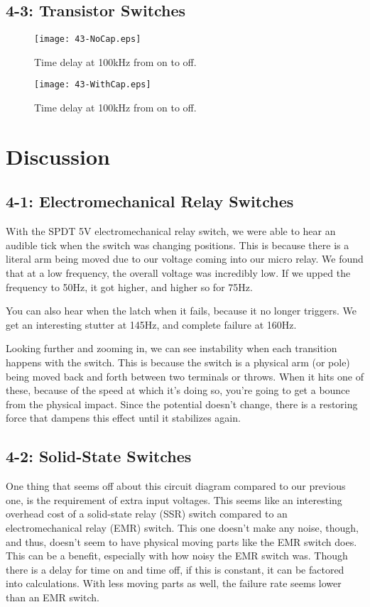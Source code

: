 \documentclass[%
 aip,
 jmp,
 amsmath,
 amssymb,
 reprint,%
 numerical,
 longbibliography,
]{revtex4-1}
\begin{document}
	\subsection{4-3: Transistor Switches}
	
	\begin{figure}[H]
	\texttt{[image: 43-NoCap.eps]}
	\caption{Time delay at 100kHz from on to off.}
	\end{figure}
	
	\begin{figure}[H]
	\texttt{[image: 43-WithCap.eps]}
	\caption{Time delay at 100kHz from on to off.}
	\end{figure}
	
\section{Discussion}
	
	\subsection{4-1: Electromechanical Relay Switches}
	
	With the SPDT 5V electromechanical relay switch, we were able to hear an audible tick when the switch
	was changing positions. This is because there is a literal arm being moved due to our voltage coming
	into our micro relay. We found that at a low frequency, the overall voltage was incredibly low. If
	we upped the frequency to 50Hz, it got higher, and higher so for 75Hz.
	
	You can also hear when the latch when it fails, because it no longer triggers. We get an interesting
	stutter at 145Hz, and complete failure at 160Hz.
	
	Looking further and zooming in, we can see instability when each transition happens with the switch.
	This is because the switch is a physical arm (or pole) being moved back and forth between two terminals
	or throws. When it hits one of these, because of the speed at which it's doing so, you're going to get a
	bounce from the physical impact. Since the potential doesn't change, there is a restoring force that
	dampens this effect until it stabilizes again. 

	\subsection{4-2: Solid-State Switches}
	
	One thing that seems off about this circuit diagram compared to our previous one, is the requirement of
	extra input voltages. This seems like an interesting overhead cost of a solid-state relay (SSR) switch compared
	to an electromechanical relay (EMR) switch. This one doesn't make any noise, though, and thus, doesn't seem to 
	have physical moving parts like the EMR switch does. This can be a benefit, especially with how noisy the
	EMR switch was. Though there is a delay for time on and time off, if this is constant, it can be factored
	into calculations. With less moving parts as well, the failure rate seems lower than an EMR switch.
	
\end{document}
